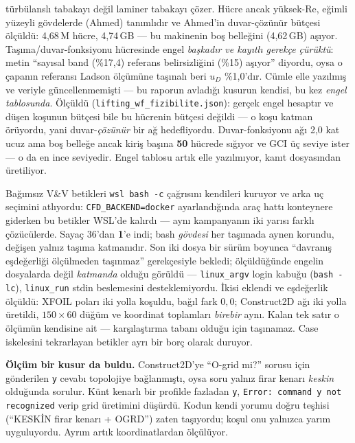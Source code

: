 \documentclass[11pt,a4paper]{article}
\begin{document}
\begin{description}
        türbülanslı tabakayı değil laminer tabakayı çözer. Hücre ancak
        yüksek-Re, eğimli yüzeyli gövdelerde (Ahmed) tanımlıdır ve Ahmed'in
        duvar-çözünür bütçesi ölçüldü: 4,68\,M hücre, 4,74\,GB --- bu makinenin
        boş belleğini (4,62\,GB) aşıyor. Taşıma/duvar-fonksiyonu hücresinde
        engel \emph{başkadır ve kayıtlı gerekçe çürüktü}: metin ``sayısal band
        (\%17,4) referans belirsizliğini (\%15) aşıyor'' diyordu, oysa o çapanın
        referansı Ladson ölçümüne taşınalı beri $u_D$ \%1{,}0'dır. Cümle elle
        yazılmış ve veriyle güncellenmemişti --- bu raporun avladığı kusurun
        kendisi, bu kez \emph{engel tablosunda}. Ölçüldü
        (\texttt{lifting\_wf\_fizibilite.json}): gerçek engel hesaptır ve
        düşen koşunun bütçesi bile bu hücrenin bütçesi değildi --- o koşu katman
        örüyordu, yani duvar-\emph{çözünür} bir ağ hedefliyordu. Duvar-fonksiyonu
        ağı 2{,}0 kat ucuz ama boş belleğe ancak kiriş başına
        \textbf{50} hücrede sığıyor ve GCI üç seviye ister --- o da en ince
        seviyedir. Engel tablosu artık elle yazılmıyor, kanıt dosyasından
        üretiliyor.
  \item[Teknik borç --- iki hızlı katman.] Bağımsız V\&V betikleri
        \texttt{wsl bash -c} çağrısını kendileri kuruyor ve arka uç seçimini
        atlıyordu: \texttt{CFD\_BACKEND=docker} ayarlandığında araç hattı
        konteynere giderken bu betikler WSL'de kalırdı --- aynı kampanyanın iki
        yarısı farklı çözücülerde. Sayaç 36'dan \textbf{1}'e indi; bash
        \emph{gövdesi} her taşımada aynen korundu, değişen yalnız taşıma
        katmanıdır. Son iki dosya bir sürüm boyunca ``davranış eşdeğerliği
        ölçülmeden taşınmaz'' gerekçesiyle bekledi; ölçüldüğünde engelin
        dosyalarda değil \emph{katmanda} olduğu görüldü --- \texttt{linux\_argv}
        login kabuğu (\texttt{bash -lc}), \texttt{linux\_run} stdin beslemesini
        desteklemiyordu. İkisi eklendi ve eşdeğerlik ölçüldü: XFOIL poları iki
        yolla koşuldu, bağıl fark $0{,}0$; Construct2D ağı iki yolla üretildi,
        $150\times60$ düğüm ve koordinat toplamları \emph{birebir} aynı.
        Kalan tek satır o ölçümün kendisine ait --- karşılaştırma tabanı olduğu
        için taşınamaz. Case iskelesini tekrarlayan betikler ayrı bir borç
        olarak duruyor.

        \textbf{Ölçüm bir kusur da buldu.} Construct2D'ye ``O-grid mi?''
        sorusu için gönderilen \texttt{y} cevabı topolojiye bağlanmıştı, oysa
        soru yalnız firar kenarı \emph{keskin} olduğunda sorulur. Künt kenarlı
        bir profilde fazladan \texttt{y}, \texttt{Error: command y not
        recognized} verip grid üretimini düşürdü. Kodun kendi yorumu doğru
        teşhisi (``KESKİN firar kenarı + OGRD'') zaten taşıyordu; koşul onu
        yalnızca yarım uyguluyordu. Ayrım artık koordinatlardan ölçülüyor.
\end{description}
\end{document}
